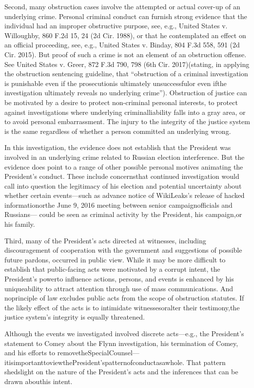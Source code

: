 {Second, many obstruction cases involve the attempted or actual cover-up of an underlying crime. Personal criminal conduct can furnish strong evidence that the individual had an improper obstructive purpose, see, e.g., United States v. Willoughby, 860 F.2d 15, 24 (2d Cir. 1988), or that he contemplated an effect on an official proceeding, see, e.g., United States v. Binday, 804 F.3d 558, 591 (2d Cir. 2015). But proof of such a crime is not an element of an obstruction offense. See United States v. Greer, 872 F.3d 790, 798 (6th Cir. 2017)(stating, in applying the obstruction sentencing guideline, that “obstruction of a criminal investigation is punishable even if the prosecutionis ultimately unsuccessfulor even ifthe investigation ultimately reveals no underlying crime”). Obstruction of justice can be motivated by a desire to protect non-criminal personal interests, to protect against investigations where underlying criminalliability falls into a gray area, or to avoid personal embarrassment. The injury to the integrity of the justice system is the same regardless of whether a person committed an underlying wrong.

In this investigation, the evidence does not establish that the President was involved in an underlying crime related to Russian election interference. But the evidence does point to a range of other possible personal motives animating the President’s conduct. These include concernsthat continued investigation would call into question the legitimacy of his election and potential uncertainty about whether certain events—such as advance notice of WikiLeaks’s release of hacked informationorthe June 9, 2016 meeting between senior campaignofficials and Russians— could be seen as criminal activity by the President, his campaign,or his family.

Third, many of the President’s acts directed at witnesses, including discouragement of cooperation with the government and suggestions of possible future pardons, occurred in public view. While it may be more difficult to establish that public-facing acts were motivated by a corrupt intent, the President’s powerto influence actions, persons, and events is enhanced by his uniqueability to attract attention through use of mass communications. And noprinciple of law excludes public acts from the scope of obstruction statutes. If the likely effect of the acts is to intimidate witnessesoralter their testimony,the justice system’s integrity is equally threatened.

Although the events we investigated involved discrete acts—e.g., the President’s statement to Comey about the Flynn investigation, his termination of Comey, and his efforts to removetheSpecialCounsel—itisimportanttoviewthePresident’spatternofconductasawhole. That pattern shedslight on the nature of the President’s acts and the inferences that can be drawn abouthis intent.

}
